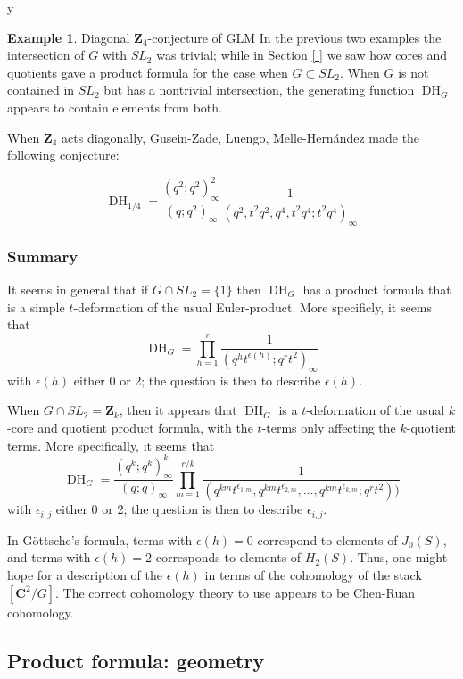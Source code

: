 y\documentclass{amsart}[12pt]
\theoremstyle{definition}
\newtheorem{example}[dummy]{Example}
\newcommand{\Z}{\mathbf{Z}}
\newcommand{\C}{\mathbf{C}}
\DeclareMathOperator{\DC}{DH}
\begin{document}
\begin{example}{Diagonal $\Z_4$-conjecture of GLM}
In the previous two examples the intersection of $G$ with $SL_2$ was trivial; while in Section \ref{ } we saw how cores and quotients gave a product formula for the case when $G\subset SL_2$.  When $G$ is not contained in $SL_2$ but has a nontrivial intersection, the generating function $\DC_G$ appears to contain elements from both.

When $\Z_4$ acts diagonally, Gusein-Zade, Luengo, Melle-Hern\'andez made the following conjecture:

$$\DC_{1/4}=\frac{(q^2;q^2)^2_\infty}{(q;q^2)_\infty} \frac{1}{(q^2, t^2q^2, q^4, t^2q^4;t^2q^4)_\infty}$$

\end{example}






\subsubsection{Summary}
It seems in general that if $G\cap SL_2=\{1\}$ then $\DC_G$ has a product formula that is a simple $t$-deformation of the usual Euler-product.  More specificly, it seems that
$$\DC_{G}=\prod_{h=1}^r \frac{1}{(q^h t^{\epsilon(h)}; q^r t^2)_\infty}$$
with $\epsilon(h)$ either 0 or 2; the question is then to describe $\epsilon(h)$.

When $G\cap SL_2=\Z_k$, then it appears that $\DC_G$ is a $t$-deformation of the usual $k$-core and quotient product formula, with the $t$-terms only affecting the $k$-quotient terms.  More specifically, it seems that
$$\DC_G=\frac{(q^k;q^k)^k_\infty}{(q;q)_\infty}
\prod_{m=1}^{r/k}\frac{1}{(q^{km}t^{\epsilon_{1,m}},q^{km}t^{\epsilon_{2,m}},\dots,q^{km}t^{\epsilon_{k,m}} ;q^rt^2))}$$
with $\epsilon_{i,j}$ either 0 or 2; the question is then to describe $\epsilon_{i,j}$.


In G\"ottsche's formula, terms with $\epsilon(h)=0$ correspond to elements of $J_0(S)$, and terms with $\epsilon(h)=2$ corresponds to elements of $H_2(S)$. Thus, one might hope for a description of the $\epsilon(h)$ in terms of the cohomology of the stack $[\C^2/G]$.  The correct cohomology theory to use appears to be Chen-Ruan cohomology.

\subsection{Product formula: geometry}
\label{sec:prod-CR}
\end{document}
